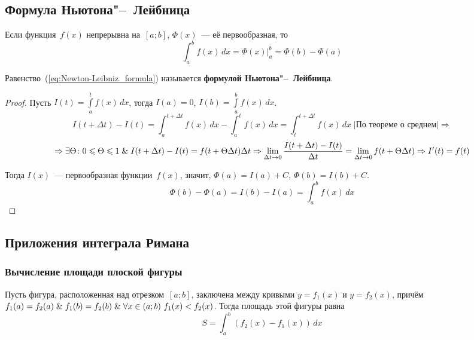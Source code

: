 \subsection{Формула Ньютона"--~Лейбница}
\begin{theorem}
Если функция~$f(x)$ непрерывна на~$[a; b]$, $\Phi(x)$~--- её первообразная, то
\begin{equation}
\label{eq:Newton-Leibniz_formula}
\int_a^b f(x)\,dx = \left. \Phi(x) \right|_a^b = \Phi(b) - \Phi(a)
\end{equation}
\end{theorem}
 Равенство~(\ref*{eq:Newton-Leibniz_formula}) называется \textbf{формулой Ньютона"--~Лейбница}.
\begin{proof}
Пусть $I(t) = \int\limits_a^t f(x)\,dx$, тогда $I(a) = 0$, $I(b) = \int\limits_a^b f(x)\,dx$.
\begin{equation*}
I(t + \Delta t) - I(t) =
\int_a^{t+\Delta t} f(x)\,dx - \int_a^t f(x)\,dx =
\int_t^{t + \Delta t} f(x)\,dx \;
\left| \text{По теореме о среднем} \right| \Rightarrow
\end{equation*}
\begin{equation*}
\Rightarrow \exists \Theta \colon 0 \leqslant \Theta \leqslant 1 \mathrel{\&} I(t + \Delta t) - I(t) = f(t + \Theta \Delta t) \Delta t \Rightarrow
\lim_{\Delta t \to 0} \frac{I(t + \Delta t) - I(t)}{\Delta t} = \lim_{\Delta t \to 0} f(t + \Theta \Delta t) \Rightarrow
I'(t) = f(t)
\end{equation*}

Тогда $I(x)$~--- первообразная функции~$f(x)$, значит, $\Phi(a) = I(a) + C$, $\Phi(b) = I(b) + C$.
\begin{equation*}
\Phi(b) - \Phi(a) = I(b) - I(a) = \int_a^b f(x)\,dx
\end{equation*}
\end{proof}

\subsection{Приложения интеграла Римана}
\subsubsection{Вычисление площади плоской фигуры}
Пусть фигура, расположенная над отрезком~$[a; b]$, заключена между кривыми $y = f_1(x)$ и $y = f_2(x)$, причём $f_1(a) = f_2(a) \mathrel{\&} f_1(b) = f_2(b) \mathrel{\&} \forall x \in (a; b) \ f_1(x) < f_2(x)$.
Тогда площадь этой фигуры равна
\begin{equation*}
S = \int_a^b (f_2(x) - f_1(x))\,dx
\end{equation*}

